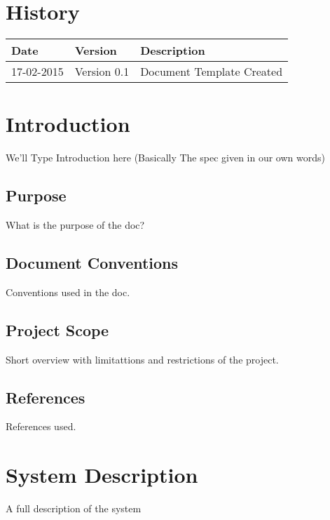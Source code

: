 \documentclass[12pt]{article}
\begin{document}


\section{History}
\begin{tabular}{|l|l|l|}

\hline
Date & Version & Description\\ %
\hline
17-02-2015 & Version 0.1 & Document Template Created\\ %

\end{tabular}

\newpage
\tableofcontents

\newpage

\section{Introduction}
We'll Type Introduction here (Basically The spec given in our own words)

\subsection{Purpose}
What is the purpose of the doc?	

\subsection{Document Conventions}
Conventions used in the doc.

\subsection{Project Scope}
Short overview with limitattions and restrictions of the project.

\subsection{References}
References used.

\section{System Description}
A full description of the system
\end{document}
